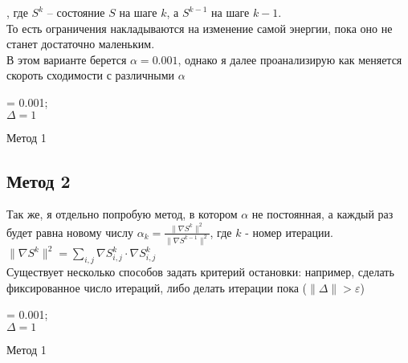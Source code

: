 \documentclass[ 12pt,x11names]{article}
\begin{document}
     , где $S^k$ -- состояние $S$ на шаге $k$, а $S^{k-1}$ на шаге $k-1$.\\
     То есть ограничения накладываются на изменение самой энергии, пока оно не станет достаточно маленьким.\\
    В этом варианте берется $\alpha = 0.001$, однако я далее проанализирую как меняется скороть сходимости  с различными $\alpha$\\
    \begin{algorithm}[H]
		\SetAlgoLined
		\alpha = 0.001;\\
		$ \Delta  = 1$\\
	\caption{Метод 1}
    \end{algorithm}
    \subsection{Метод 2}
    Так же, я  отдельно попробую метод, в котором  $\alpha$ не постоянная, а каждый раз будет равна новому числу
     $\alpha_k  = \frac{\| \nabla S^k \|^2}{\| \nabla S^{k-1} \|^2}$, где $k$ - номер итерации.\\
     $\| \nabla S^k \|^2  = \displaystyle{\sum_{i, j}}  \nabla S^k_{i,j} \cdot  \nabla S^k_{i,j}$\\
    Существует несколько способов задать критерий остановки: например, сделать фиксированное число итераций, либо делать итерации пока  ($\| \Delta \|> \varepsilon$)\\
    \begin{algorithm}[H]
		\SetAlgoLined
		\alpha = 0.001;\\
		$ \Delta  = 1$\\
	\caption{Метод 1}
    \end{algorithm}
\end{document}
